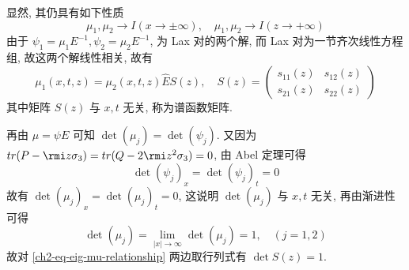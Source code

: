 显然, 其仍具有如下性质
\begin{equation}
    \mu_{1}, \mu_{2} \to I (x \to \pm \infty), \quad  \mu_{1}, \mu_{2} \to I (z \to + \infty)
\end{equation}
由于 $ \psi_{1} = \mu_{1} E^{-1}, \psi_{2} = \mu_{2} E^{-1} $, 为 Lax 对的两个解, 而 Lax 对为一节齐次线性方程组, 故这两个解线性相关, 故有
\begin{equation}
    \mu_{1}(x,t,z) = \mu_{2}(x,t,z) \hat{E} S(z), \label{ch2-eq-eig-mu-relationship} \quad
    S(z) =
    \begin{pmatrix}
        s_{11}(z) & s_{12}(z) \\ s_{21}(z) & s_{22}(z)
    \end{pmatrix}
\end{equation}
其中矩阵 $ S(z) $ 与 $ x,t $ 无关, 称为谱函数矩阵.

再由 $ \mu = \psi E $ 可知 $ \det(\mu_{j}) = \det(\psi_{j}) $. 又因为 $ tr(P - \rmi z \sigma_{3}) = tr(Q - 2 \rmi z^2 \sigma_{3}) = 0 $, 由 Abel 定理可得
\begin{equation}
    \det(\psi_{j})_{x} = \det(\psi_{j})_{t} = 0
\end{equation}
故有 $ \det(\mu_{j})_x = \det(\mu_{j})_{t} = 0 $, 这说明 $ \det(\mu_{j}) $ 与 $ x,t $ 无关, 再由渐进性可得
\begin{equation}
    \det(\mu_{j}) = \lim_{|x| \to \infty} \det(\mu_{j}) = 1, \quad(j = 1,2) \label{ch2-eq-mu-det}
\end{equation}
故对 \eqref{ch2-eq-eig-mu-relationship} 两边取行列式有 $ \det S(z) = 1 $.

